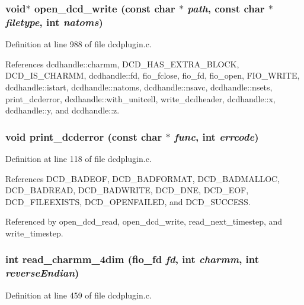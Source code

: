 \subsubsection{\setlength{\rightskip}{0pt plus 5cm}void$\ast$ open\_\-dcd\_\-write (const char $\ast$ {\em path}, const char $\ast$ {\em filetype}, int {\em natoms})\hspace{0.3cm}{\tt  [static]}}\label{dcdplugin_8c_a38}




Definition at line 988 of file dcdplugin.c.

References dcdhandle::charmm, DCD\_\-HAS\_\-EXTRA\_\-BLOCK, DCD\_\-IS\_\-CHARMM, dcdhandle::fd, fio\_\-fclose, fio\_\-fd, fio\_\-open, FIO\_\-WRITE, dcdhandle::istart, dcdhandle::natoms, dcdhandle::nsavc, dcdhandle::nsets, print\_\-dcderror, dcdhandle::with\_\-unitcell, write\_\-dcdheader, dcdhandle::x, dcdhandle::y, and dcdhandle::z.
\subsubsection{\setlength{\rightskip}{0pt plus 5cm}void print\_\-dcderror (const char $\ast$ {\em func}, int {\em errcode})\hspace{0.3cm}{\tt  [static]}}\label{dcdplugin_8c_a25}




Definition at line 118 of file dcdplugin.c.

References DCD\_\-BADEOF, DCD\_\-BADFORMAT, DCD\_\-BADMALLOC, DCD\_\-BADREAD, DCD\_\-BADWRITE, DCD\_\-DNE, DCD\_\-EOF, DCD\_\-FILEEXISTS, DCD\_\-OPENFAILED, and DCD\_\-SUCCESS.

Referenced by open\_\-dcd\_\-read, open\_\-dcd\_\-write, read\_\-next\_\-timestep, and write\_\-timestep.
\subsubsection{\setlength{\rightskip}{0pt plus 5cm}int read\_\-charmm\_\-4dim ({\bf fio\_\-fd} {\em fd}, int {\em charmm}, int {\em reverse\-Endian})\hspace{0.3cm}{\tt  [static]}}\label{dcdplugin_8c_a29}




Definition at line 459 of file dcdplugin.c.

